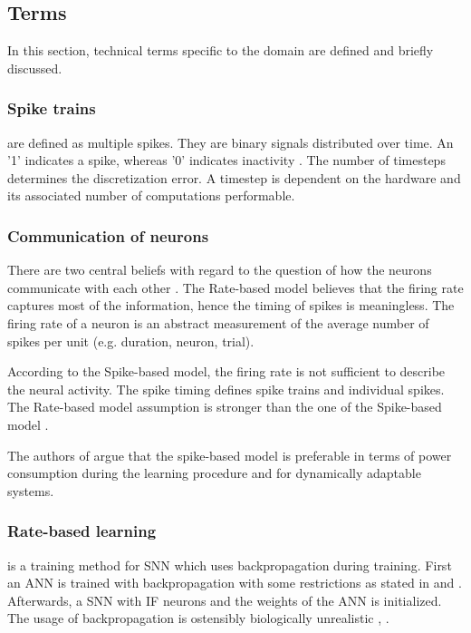 \newcommand\rbModel{Rate-based model}
\newcommand\sbModel{Spike-based model}
\subsection{Terms}
\label{subsec:terms}

In this section, technical terms specific to the domain are defined and briefly discussed.

\subsubsection{Spike trains}
are defined as multiple spikes.
They are binary signals distributed over time.
An '1' indicates a spike, whereas '0' indicates inactivity \cite{DIET_SNN}.
The number of timesteps determines the discretization error.
A timestep is dependent on the hardware and its associated number of computations performable.

\subsubsection{Communication of neurons}
\label{subsubsec:communication}
There are two central beliefs with regard to the question of how the neurons communicate with each other \cite{spike_vs_rate}.
The \rbModel{} believes that the firing rate captures most of the information, hence the timing of spikes is meaningless.
The firing rate of a neuron is an abstract measurement of the average number of spikes per unit (e.g. duration, neuron, trial).

According to the \sbModel{}, the firing rate is not sufficient to describe the neural activity.
The spike timing defines spike trains and individual spikes.
The \rbModel{} assumption is stronger than the one of the \sbModel{} \cite{spike_vs_rate}.

The authors of \cite{SNN} argue that the spike-based model is preferable in terms of power consumption 
during the learning procedure and for dynamically adaptable systems.


\subsubsection{Rate-based learning} is a training method for \ac{SNN} which uses backpropagation during training. 
First an \ac{ANN} is trained with backpropagation with some restrictions as stated in \cite{DIET_SNN} and \cite{ANN_SNN_conversion}.
Afterwards, a \ac{SNN} with \ac{IF} neurons and the weights of the \ac{ANN} is initialized.
The usage of backpropagation is ostensibly biologically unrealistic \cite{SNN}, \cite{STDP_like}.
